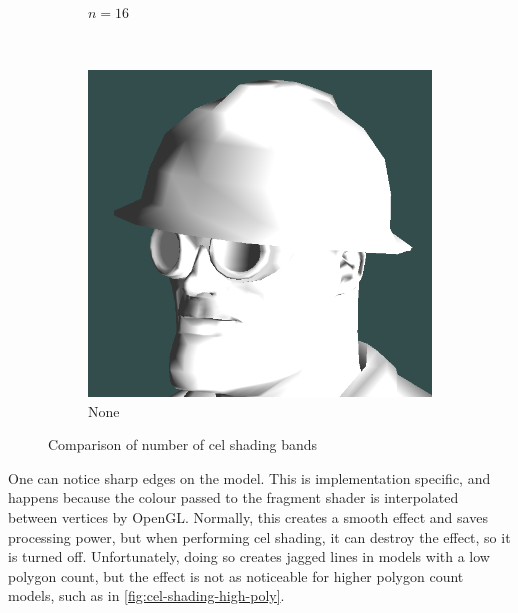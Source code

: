 \begin{figure}[h]
\begin{subfigure}[b]{0.15\textwidth}
        \caption{$n = 16$}
        \label{fig:cel-shading-n16}
    \end{subfigure}
    ~
    \begin{subfigure}[b]{0.15\textwidth}
        \includegraphics[width=\textwidth]{img/cel-shading-none.png}
        \caption{None}
        \label{fig:cel-shading-none}
    \end{subfigure}
    \caption{Comparison of number of cel shading bands}
    \label{fig:cel-band-comparison}
\end{figure}

One can notice sharp edges on the model. This is implementation specific, and happens because the 
colour passed to the fragment shader is interpolated between vertices by OpenGL. Normally, this creates 
a smooth effect and saves processing power, but when performing cel shading, it can destroy the effect, 
so it is turned off. Unfortunately, doing so creates jagged lines in models with a low polygon count, 
but the effect is  not as noticeable for higher polygon count models, such as in 
\autoref{fig:cel-shading-high-poly}. 

